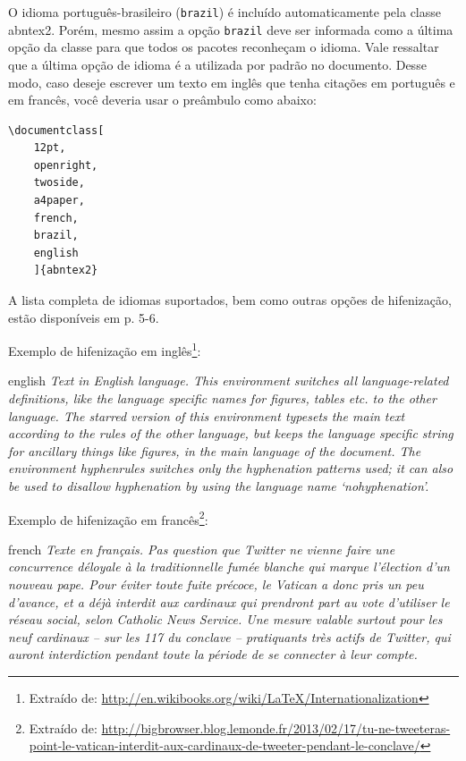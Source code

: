 O idioma português-brasileiro (\texttt{brazil}) é incluído automaticamente pela
classe \textsf{abntex2}. Porém, mesmo assim a opção \texttt{brazil} deve ser
informada como a última opção da classe para que todos os pacotes reconheçam o
idioma. Vale ressaltar que a última opção de idioma é a utilizada por padrão no
documento. Desse modo, caso deseje escrever um texto em inglês que tenha
citações em português e em francês, você deveria usar o preâmbulo como abaixo:

\begin{verbatim}
\documentclass[
	12pt,
	openright,
	twoside,
	a4paper,
	french,
	brazil,
	english
	]{abntex2}
\end{verbatim}

A lista completa de idiomas suportados, bem como outras opções de hifenização,
estão disponíveis em \cite{babel} p. 5-6.

Exemplo de hifenização em inglês\footnote{Extraído de:
\url{http://en.wikibooks.org/wiki/LaTeX/Internationalization}}:

\begin{otherlanguage*}{english}
\textit{Text in English language. This environment switches all language-related
definitions, like the language specific names for figures, tables etc. to the other
language. The starred version of this environment typesets the main text
according to the rules of the other language, but keeps the language specific
string for ancillary things like figures, in the main language of the document.
The environment hyphenrules switches only the hyphenation patterns used; it can
also be used to disallow hyphenation by using the language name
`nohyphenation'.}
\end{otherlanguage*}

Exemplo de hifenização em francês\footnote{Extraído de:
\url{http://bigbrowser.blog.lemonde.fr/2013/02/17/tu-ne-tweeteras-point-le-vatican-interdit-aux-cardinaux-de-tweeter-pendant-le-conclave/}}:

\begin{otherlanguage*}{french}
\textit{Texte en français. Pas question que Twitter ne vienne faire une
concurrence déloyale à la traditionnelle fumée blanche qui marque l'élection
d'un nouveau pape. Pour éviter toute fuite précoce, le Vatican a donc pris un
peu d'avance, et a déjà interdit aux cardinaux qui prendront part au vote
d'utiliser le réseau social, selon Catholic News Service. Une mesure valable
surtout pour les neuf cardinaux – sur les 117 du conclave – pratiquants très
actifs de Twitter, qui auront interdiction pendant toute la période de se
connecter à leur compte.}
\end{otherlanguage*}

